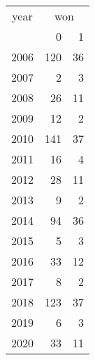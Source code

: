 \footnotesize\begin{tabular}[t]{lrr}
\toprule
\multicolumn{1}{c}{year} & \multicolumn{2}{c}{won} \\
\cmidrule(l{3pt}r{3pt}){1-1} \cmidrule(l{3pt}r{3pt}){2-3}
  & 0 & 1\\
\midrule
2006 & 120 & 36\\
2007 & 2 & 3\\
2008 & 26 & 11\\
2009 & 12 & 2\\
2010 & 141 & 37\\
2011 & 16 & 4\\
2012 & 28 & 11\\
2013 & 9 & 2\\
2014 & 94 & 36\\
2015 & 5 & 3\\
2016 & 33 & 12\\
2017 & 8 & 2\\
2018 & 123 & 37\\
2019 & 6 & 3\\
2020 & 33 & 11\\
\bottomrule
\end{tabular}
